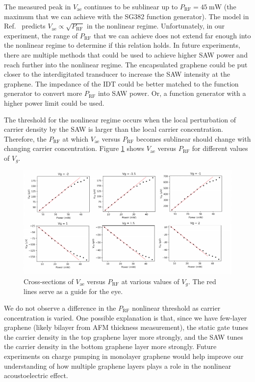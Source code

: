 \documentclass[double,12pt,1in,seploa]{beavtex}
\begin{document}
The measured peak in $V_{\mathrm{ae}}$ continues to be sublinear up to $P_{\mathrm{RF}} = \SI{45}{\milli\watt}$ (the maximum that we can achieve with the SG382 function generator). The model in Ref.\ \cite{rotter_nonlinear_1999} predicts $V_{\mathrm{ae}} \propto \sqrt{P_{\mathrm{RF}}}$ in the nonlinear regime. Unfortunately, in our experiment, the range of $P_{\mathrm{RF}}$ that we can achieve does not extend far enough into the nonlinear regime to determine if this relation holds. In future experiments, there are multiple methods that could be used to achieve higher SAW power and reach further into the nonlinear regime. The encapsulated graphene could be put closer to the interdigitated transducer to increase the SAW intensity at the graphene. The impedance of the IDT could be better matched to the function generator to convert more $P_{\mathrm{RF}}$ into SAW power. Or, a function generator with a higher power limit could be used.

The threshold for the nonlinear regime occurs when the local perturbation of carrier density by the SAW is larger than the local carrier concentration. Therefore, the $P_{\mathrm{RF}}$ at which $V_{\mathrm{ae}}$ versus $P_{\mathrm{RF}}$ becomes sublinear should change with changing carrier concentration. Figure \ref{vae vs prf at different vg} shows $V_{\mathrm{ae}}$ versus $P_{\mathrm{RF}}$ for different values of $V_g$. 
\begin{figure}
    \includegraphics[width = 1\textwidth]{vae prf nonlinear at different vg.pdf}
    \caption{Cross-sections of $V_{\mathrm{ae}}$ versus $P_{\mathrm{RF}}$ at various values of $V_g$. The red lines serve as a guide for the eye.}
    \label{vae vs prf at different vg}
\end{figure}
We do not observe a difference in the $P_{\mathrm{RF}}$ nonlinear threshold as carrier concentration is varied. One possible explanation is that, since we have few-layer graphene (likely bilayer from AFM thickness measurement), the static gate tunes the carrier density in the top graphene layer more strongly, and the SAW tunes the carrier density in the bottom graphene layer more strongly. Future experiments on charge pumping in monolayer graphene would help improve our understanding of how multiple graphene layers plays a role in the nonlinear acoustoelectric effect.
\end{document}
